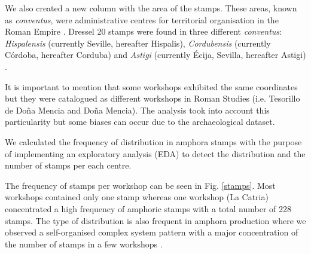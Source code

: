 \documentclass[review]{elsarticle}
\newcommand{\memo}[2]{\textcolor{#1}{#2}}
\newcommand{\xavi}[1]{\memo{magenta}{XRC: #1\\}}
\begin{document}

We also created a new column with the area of the stamps. These areas, known as \textit{conventus}, were administrative centres for territorial organisation in the Roman Empire \citep[58]{ozcariz_gil_administracion_2013}.
Dressel 20 stamps were found in three different \textit{conventus}: \textit{Hispalensis} (currently Seville, hereafter Hispalis), \textit{Cordubensis} (currently C\'ordoba, hereafter Corduba) and \textit{Astigi} (currently Écija, Sevilla, hereafter Astigi) \citep{rodriguez_economioleicola_1977,
chicdatos2001,berni_millet_epigrafianforica_2008} . 


It is important to mention that some workshops exhibited the same coordinates but they were catalogued as different workshops in Roman Studies (i.e. Tesorillo de Doña Mencia and Doña Mencia). The analysis took into account this particularity but some biases can occur due to the archaeological dataset. 

We calculated the frequency of distribution in amphora stamps with the purpose of implementing an exploratory analysis (EDA) to detect the distribution and the number of stamps per each centre.  

The frequency of stamps per workshop can be seen in Fig. \ref{stamps}. Most 
workshops contained only one stamp whereas one workshop (La Catria) concentrated a high frequency of amphoric stamps with a total number of 228 stamps. The type of distribution is also frequent in amphora production where we observed a self-organised complex system pattern with a major concentration of the number of stamps in a few workshops \citep{bayesian_2018,coto-sarmiento_identifying_2018}.


\end{document}
